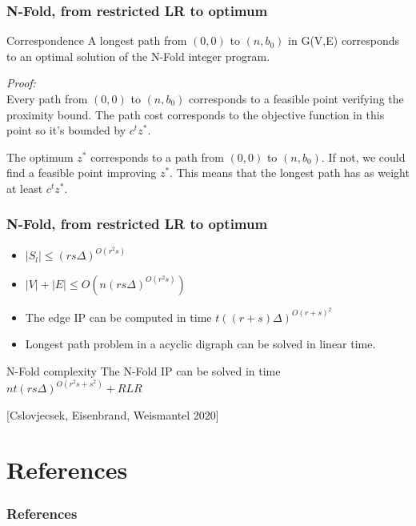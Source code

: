 \documentclass{beamer}
\begin{document}
    \begin{frame}
        \frametitle{N-Fold, from restricted LR to optimum}
        \begin{block}{Correspondence}
            A longest path from $(0,0)$ to $(n,b_0)$ in G(V,E) corresponds to an optimal solution of the N-Fold integer program.
        \end{block}
        \textit{Proof:}\\
        Every path from $(0,0)$ to $(n,b_0)$ corresponds to a feasible point verifying the proximity bound. The path cost corresponds to the objective function in this point so it's bounded by $c^tz^*$. 
        
        \vspace{0.3cm}
        The optimum $z^*$ corresponds to a path from $(0,0)$ to $(n,b_0)$. If not, we could find a feasible point improving $z^*$. This means that the longest path has as weight at least $c^tz^*$.
        
        \vspace{0.3cm}
        
        
    \end{frame}
    \begin{frame}
        \frametitle{N-Fold, from restricted LR to optimum}
        \begin{itemize}
            \item $|S_l| \leq (rs\Delta)^{O(r^2s)}$
            \item $|V| + |E| \leq O(n(rs\Delta)^{O(r^2s)})$
            \item The edge IP can be computed in time $t((r + s)\Delta)^{O(r + s)^2}$
            \item Longest path problem in a acyclic digraph can be solved in linear time.
        \end{itemize}
        \vspace{1cm}
        \begin{block}{N-Fold complexity}
            The N-Fold IP can be solved in time $nt(rs\Delta)^{O(r^2s + s^2)} + RLR$
        \end{block}
        [Cslovjecsek, Eisenbrand, Weismantel 2020]
    \end{frame}
    
    \section{References}
    \begin{frame}[allowframebreaks] %
        \frametitle{References}
        \nocite{*}
        \printbibliography
    \end{frame}
\end{document}
